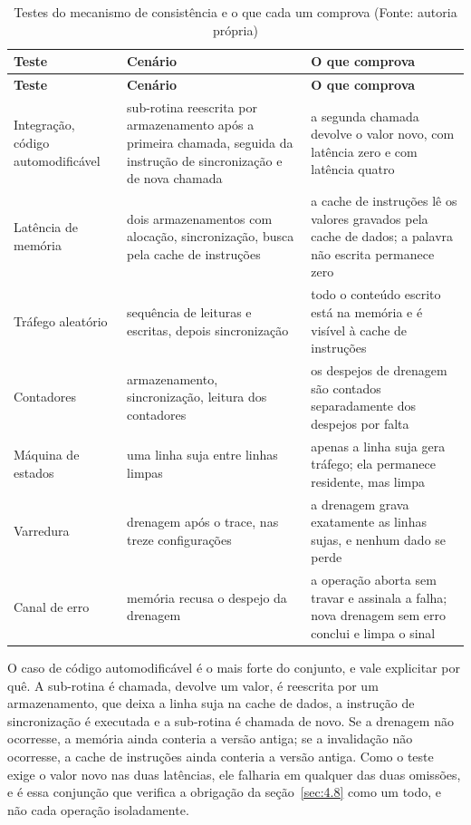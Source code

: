 {\small
\begin{longtable}{@{}>{\raggedright\arraybackslash}p{}>{\raggedright\arraybackslash}p{}>{\raggedright\arraybackslash}p{}@{}}
\caption[Testes do mecanismo de consistência e o que cada um comprova]{Testes do mecanismo de consistência e o que cada um comprova (Fonte: autoria própria)}\label{tab:6.3}\\
\hline
\textbf{Teste} & \textbf{Cenário} & \textbf{O que comprova} \\
\hline
\endfirsthead
\hline
\textbf{Teste} & \textbf{Cenário} & \textbf{O que comprova} \\
\hline
\endhead
\hline
\endlastfoot
Integração, código automodificável & sub-rotina reescrita por armazenamento após a primeira chamada, seguida da instrução de sincronização e de nova chamada & a segunda chamada devolve o valor novo, com latência zero e com latência quatro \\
Latência de memória & dois armazenamentos com alocação, sincronização, busca pela cache de instruções & a cache de instruções lê os valores gravados pela cache de dados; a palavra não escrita permanece zero \\
Tráfego aleatório & sequência de leituras e escritas, depois sincronização & todo o conteúdo escrito está na memória e é visível à cache de instruções \\
Contadores & armazenamento, sincronização, leitura dos contadores & os despejos de drenagem são contados separadamente dos despejos por falta \\
Máquina de estados & uma linha suja entre linhas limpas & apenas a linha suja gera tráfego; ela permanece residente, mas limpa \\
Varredura & drenagem após o trace, nas treze configurações & a drenagem grava exatamente as linhas sujas, e nenhum dado se perde \\
Canal de erro & memória recusa o despejo da drenagem & a operação aborta sem travar e assinala a falha; nova drenagem sem erro conclui e limpa o sinal \\
\end{longtable}
}

O caso de código automodificável é o mais forte do conjunto, e vale explicitar por quê. A sub-rotina é chamada, devolve um valor, é reescrita por um armazenamento, que deixa a linha suja na cache de dados, a instrução de sincronização é executada e a sub-rotina é chamada de novo. Se a drenagem não ocorresse, a memória ainda conteria a versão antiga; se a invalidação não ocorresse, a cache de instruções ainda conteria a versão antiga. Como o teste exige o valor novo nas duas latências, ele falharia em qualquer das duas omissões, e é essa conjunção que verifica a obrigação da seção~\ref{sec:4.8} como um todo, e não cada operação isoladamente.

